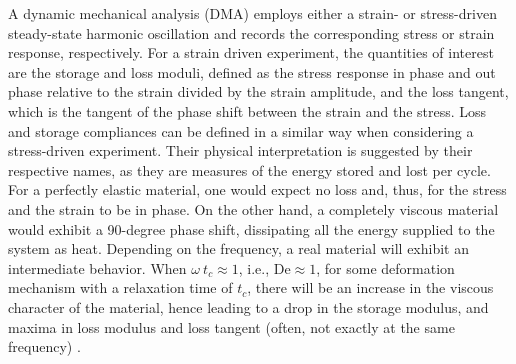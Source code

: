 A dynamic mechanical analysis (DMA) employs either a strain- or stress-driven steady-state harmonic oscillation and records the corresponding stress or strain response, respectively.
For a strain driven experiment, the quantities of interest are the storage and loss moduli, defined as the stress response in phase and out phase relative to the strain divided by the strain amplitude, and the loss tangent, which is the tangent of the phase shift between the strain and the stress.
Loss and storage compliances can be defined in a similar way when considering a stress-driven experiment.
Their physical interpretation is suggested by their respective names, as they are measures of the energy stored and lost per cycle.
For a perfectly elastic material, one would expect no loss and, thus, for the stress and the strain to be in phase.
On the other hand, a completely viscous material would exhibit a 90-degree phase shift, dissipating all the energy supplied to the system as heat.
Depending on the frequency, a real material will exhibit an intermediate behavior.
When $\omega\ t_c \approx 1$, i.e., $\mathrm{De} \approx 1$, for some deformation mechanism with a relaxation time of $t_c$, there will be an increase in the viscous character of the material, hence leading to a drop in  the storage modulus, and maxima in loss modulus and loss tangent (often, not exactly at the same frequency) \citep{ferryViscoelasticPropertiesPolymers1980}.

